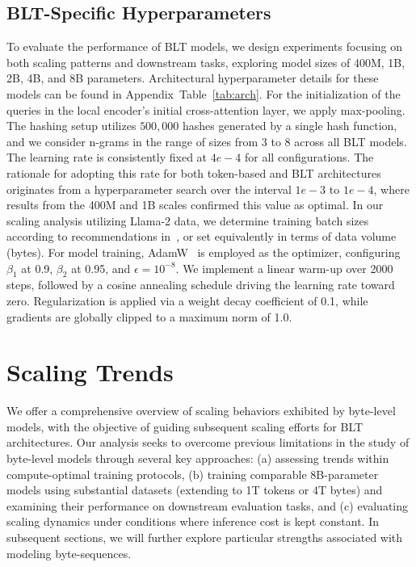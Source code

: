 \subsection{{\textsc BLT}-Specific Hyperparameters}  
To evaluate the performance of {\textsc BLT} models, we design experiments focusing on both scaling patterns and downstream tasks, exploring model sizes of 400M, 1B, 2B, 4B, and 8B parameters. Architectural hyperparameter details for these models can be found in Appendix~Table~\ref{tab:arch}.  
For the initialization of the queries in the local encoder's initial cross-attention layer, we apply max-pooling. The hashing setup utilizes $500,000$ hashes generated by a single hash function, and we consider n-grams in the range of sizes from 3 to 8 across all {\textsc BLT} models. The learning rate is consistently fixed at $4e-4$ for all configurations. The rationale for adopting this rate for both token-based and {\textsc BLT} architectures originates from a hyperparameter search over the interval $1e-3$ to $1e-4$, where results from the 400M and 1B scales confirmed this value as optimal. In our scaling analysis utilizing Llama-2 data, we determine training batch sizes according to recommendations in~\cite{dubey2024llama}, or set equivalently in terms of data volume (bytes). For model training, AdamW~\citep{adamw} is employed as the optimizer, configuring $\beta_1$ at 0.9, $\beta_2$ at 0.95, and $\epsilon=10^{-8}$. We implement a linear warm-up over 2000 steps, followed by a cosine annealing schedule driving the learning rate toward zero. Regularization is applied via a weight decay coefficient of 0.1, while gradients are globally clipped to a maximum norm of 1.0.

\section{Scaling Trends}
\label{section:scaling}

We offer a comprehensive overview of scaling behaviors exhibited by byte-level models, with the objective of guiding subsequent scaling efforts for {\textsc BLT} architectures. Our analysis seeks to overcome previous limitations in the study of byte-level models through several key approaches: (a) assessing trends within compute-optimal training protocols, (b) training comparable 8B-parameter models using substantial datasets (extending to 1T tokens or 4T bytes) and examining their performance on downstream evaluation tasks, and (c) evaluating scaling dynamics under conditions where inference cost is kept constant. In subsequent sections, we will further explore particular strengths associated with modeling byte-sequences.

